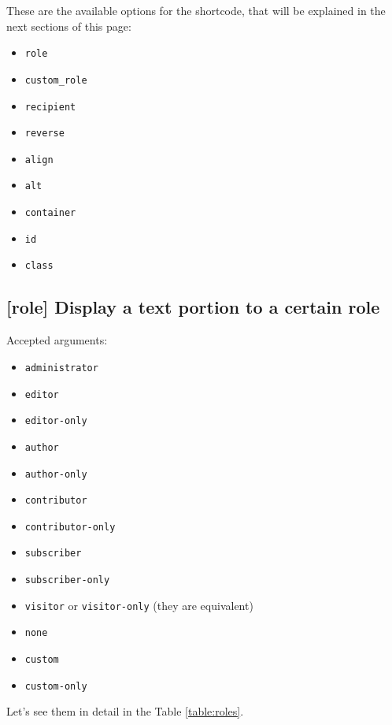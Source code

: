 \documentclass[a4paper,10pt]{article}
\begin{document}
These are the available options for the shortcode, that will be explained in the next sections of this page:

\begin{itemize}
 \item \verb+role+
 \item \verb+custom_role+
 \item \verb+recipient+
 \item \verb+reverse+
 \item \verb+align+
 \item \verb+alt+
 \item \verb+container+
 \item \verb+id+
 \item \verb+class+
\end{itemize}

\subsection{[role] Display a text portion to a certain role}

Accepted arguments:

\begin{itemize}
 \item \verb+administrator+
 \item \verb+editor+
 \item \verb+editor-only+
 \item \verb+author+
 \item \verb+author-only+
 \item \verb+contributor+
 \item \verb+contributor-only+
 \item \verb+subscriber+
 \item \verb+subscriber-only+
 \item \verb+visitor+ or \verb+visitor-only+ (they are equivalent)
 \item \verb+none+
 \item \verb+custom+
 \item \verb+custom-only+
\end{itemize}

Let's see them in detail in the Table \ref{table:roles}.
\end{document}
